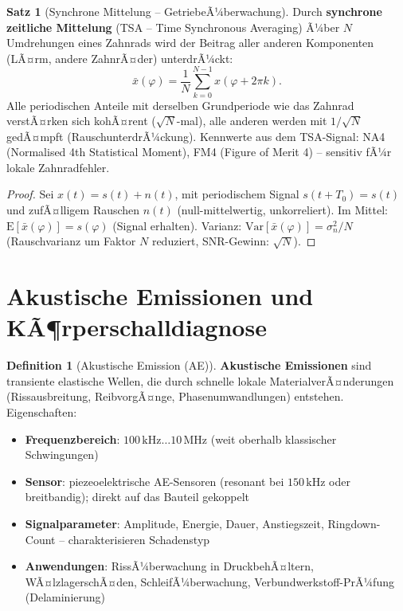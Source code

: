 ﻿\documentclass[a4paper,12pt]{report}
\theoremstyle{definition}
\newtheorem{definition}{Definition}
\newtheorem{satz}{Satz}
\begin{document}
\begin{satz}[Synchrone Mittelung -- GetriebeÃ¼berwachung]
Durch \textbf{synchrone zeitliche Mittelung} (TSA -- Time Synchronous Averaging)
Ã¼ber $N$ Umdrehungen eines Zahnrads wird der Beitrag aller anderen
Komponenten (LÃ¤rm, andere ZahnrÃ¤der) unterdrÃ¼ckt:
\[
  \bar{x}(\varphi) = \frac{1}{N}\sum_{k=0}^{N-1} x(\varphi + 2\pi k).
\]
Alle periodischen Anteile mit derselben Grundperiode wie das Zahnrad
verstÃ¤rken sich kohÃ¤rent ($\sqrt{N}$-mal), alle anderen werden
mit $1/\sqrt{N}$ gedÃ¤mpft (RauschunterdrÃ¼ckung).
Kennwerte aus dem TSA-Signal: NA4 (Normalised 4th Statistical Moment),
FM4 (Figure of Merit 4) -- sensitiv fÃ¼r lokale Zahnradfehler.
\end{satz}
\begin{proof}
Sei $x(t) = s(t) + n(t)$, mit periodischem Signal $s(t+T_0) = s(t)$
und zufÃ¤lligem Rauschen $n(t)$ (null-mittelwertig, unkorreliert).
Im Mittel:
$\mathrm{E}[\bar{x}(\varphi)] = s(\varphi)$ (Signal erhalten).
Varianz: $\mathrm{Var}[\bar{x}(\varphi)] = \sigma_n^2/N$
(Rauschvarianz um Faktor $N$ reduziert, SNR-Gewinn: $\sqrt{N}$).
\end{proof}

\section{Akustische Emissionen und KÃ¶rperschalldiagnose}

\begin{definition}[Akustische Emission (AE)]
\textbf{Akustische Emissionen} sind transiente elastische Wellen,
die durch schnelle lokale MaterialverÃ¤nderungen (Rissausbreitung,
ReibvorgÃ¤nge, Phasenumwandlungen) entstehen.
Eigenschaften:
\begin{itemize}
    \item[-] \textbf{Frequenzbereich}: $100\,\mathrm{kHz}\ldots10\,\mathrm{MHz}$
          (weit oberhalb klassischer Schwingungen)
    \item[-] \textbf{Sensor}: piezeoelektrische AE-Sensoren (resonant bei
          $150\,\mathrm{kHz}$ oder breitbandig); direkt auf das Bauteil gekoppelt
    \item[-] \textbf{Signalparameter}: Amplitude, Energie, Dauer, Anstiegszeit,
          Ringdown-Count -- charakterisieren Schadenstyp
    \item[-] \textbf{Anwendungen}: RissÃ¼berwachung in DruckbehÃ¤ltern,
          WÃ¤lzlagerschÃ¤den, SchleifÃ¼berwachung, Verbundwerkstoff-PrÃ¼fung (Delaminierung)
\end{itemize}
\end{definition}
\end{document}
